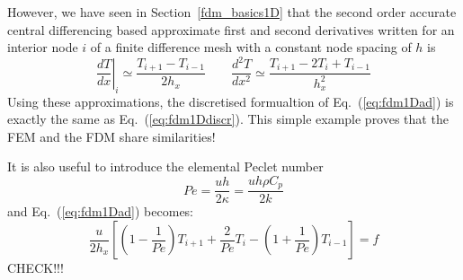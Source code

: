 However, we have seen in Section~\ref{fdm_basics1D} that the 
second order accurate central differencing based approximate first and second
derivatives written for an interior node $i$ 
of a finite difference mesh with a constant node spacing of $h$ is 
\[
\left. \frac{dT}{dx}\right|_i
\simeq \frac{T_{i+1}-T_{i-1}}{2 h_x}
\qquad
\frac{d^2T}{dx^2} 
\simeq \frac{T_{i+1}-2T_i+T_{i-1}}{h_x^2}
\]
Using these approximations, the discretised formualtion of Eq.~(\ref{eq:fdm1Dad}) is
exactly the same as Eq.~(\ref{eq:fdm1Ddiscr}).
This simple example proves that the FEM and the FDM share similarities!


It is also useful to introduce the elemental Peclet number
\[
Pe = \frac{uh}{2 \kappa} = \frac{u h \rho C_p}{2 k}
\]
and Eq.~(\ref{eq:fdm1Dad}) becomes:
\[
\frac{u}{2h_x}
\left[
\left(1-\frac{1}{Pe}\right) T_{i+1} + \frac{2}{Pe} T_i - \left(1+\frac{1}{Pe}\right)T_{i-1} 
\right] = f
\]
CHECK!!!













